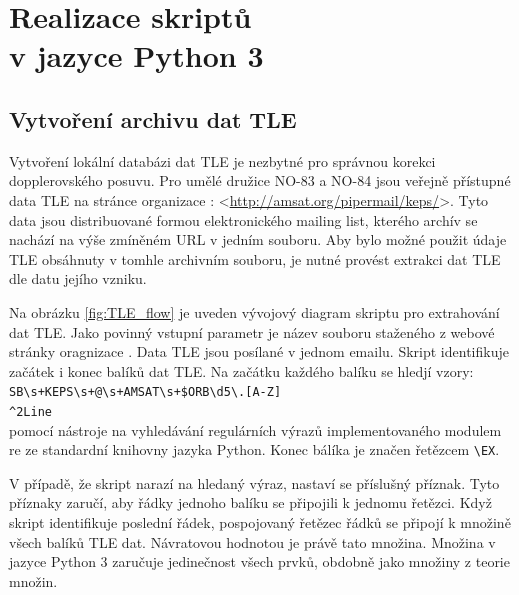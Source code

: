 \chapter[Realizace skriptů v jazyce Python 3]{Realizace skriptů\\ v jazyce Python 3}

\section{Vytvoření archivu dat TLE}
  Vytvoření lokální databázi dat TLE je nezbytné pro správnou korekci dopplerovského posuvu. Pro umělé družice NO-83 a NO-84 jsou veřejně přístupné data TLE na stránce organizace : <\url{http://amsat.org/pipermail/keps/}>. Tyto data jsou distribuované formou elektronického mailing list, kterého archív se nachází na výše zmíněném URL v jedním souboru. Aby bylo možné použit údaje TLE obsáhnuty v tomhle archivním souboru, je nutné provést extrakci dat TLE dle datu jejího vzniku.

  Na obrázku \ref{fig:TLE_flow} je uveden vývojový diagram skriptu pro extrahování dat TLE. Jako povinný vstupní parametr je název souboru staženého z webové stránky oragnizace . Data TLE jsou posílané v jednom emailu. Skript identifikuje začátek i konec balíků dat TLE. Na začátku každého balíku se hledjí vzory:\\
  \texttt{SB\textbackslash s+KEPS\textbackslash s+@\textbackslash s+AMSAT\textbackslash s+\$ORB\textbackslash d{5}\textbackslash.[A-Z]}\\
  \texttt{\textasciicircum 2Line}\\
  pomocí nástroje na vyhledávání regulárních výrazů implementovaného modulem re ze standardní knihovny jazyka Python. Konec bálíka je značen řetězcem
  \texttt{\textbackslash EX}.

  V případě, že skript narazí na hledaný výraz, nastaví se příslušný příznak. Tyto příznaky zaručí, aby řádky jednoho balíku se připojili k jednomu řetězci. Když skript identifikuje poslední řádek, pospojovaný řetězec řádků se připojí k množině všech balíků TLE dat. Návratovou hodnotou je právě tato množina. Množina v jazyce Python 3 zaručuje jedinečnost všech prvků, obdobně jako množiny z teorie množin.

